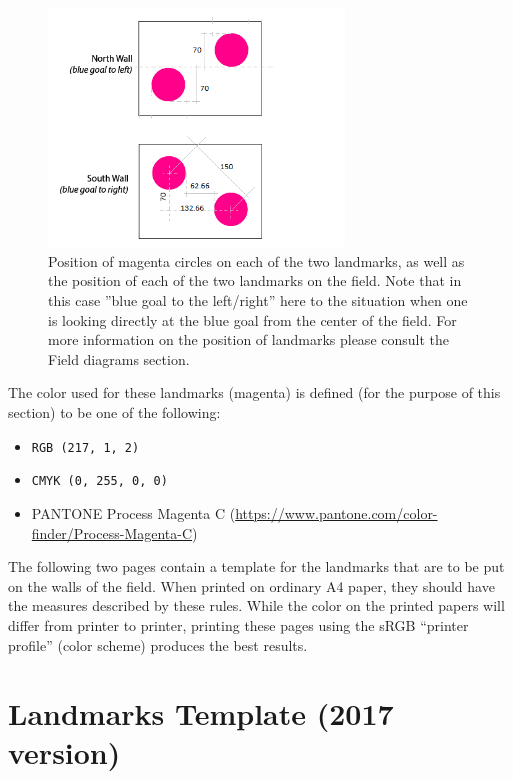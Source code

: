 \documentclass{article}
\begin{document}
\begin{figure}[H]
    \centering
    \includegraphics[width=0.7\textwidth]{media/landmarks_blueprint.png}
    \caption{Position of magenta circles on each of the two landmarks, as well
        as the position of each of the two landmarks on the field. Note that in
        this case ''blue goal to the left/right'' here to the situation when
        one is looking directly at the blue goal from the center of the field.
        For more information on the position of landmarks please consult the
        Field diagrams section.}
    \label{fig:landmarks_blueprint}
\end{figure}

The color used for these landmarks (magenta) is defined (for the purpose of
this section) to be one of the following:

\begin{itemize}
    \item \texttt{RGB (217, 1, 2)}
    \item \texttt{CMYK (0, 255, 0, 0)}
    \item PANTONE Process Magenta C (\url{https://www.pantone.com/color-finder/Process-Magenta-C})
\end{itemize}


The following two pages contain a template for the landmarks that are to be
put on the walls of the field. When printed on ordinary A4 paper, they should
have the measures described by these rules. While the color on the printed
papers will differ from printer to printer, printing these pages using the sRGB
``printer profile'' (color scheme) produces the best results.




\section{Landmarks Template (2017 version)\label{ref-066}}
\end{document}
